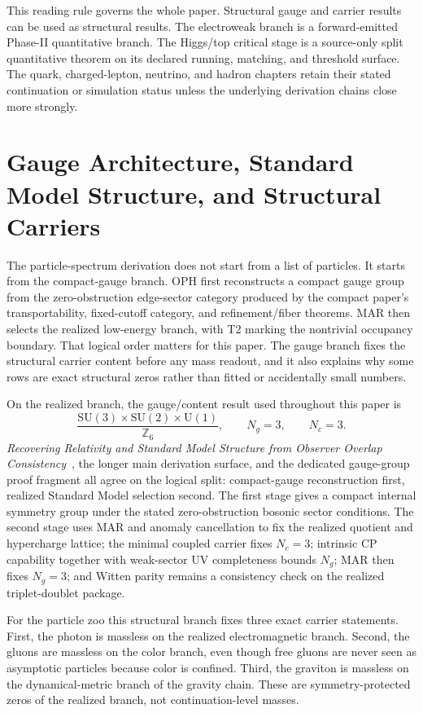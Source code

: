 \documentclass[11pt]{article}
\newcommand{\SU}{\mathrm{SU}}
\newcommand{\U}{\mathrm{U}}
\begin{document}
This reading rule governs the whole paper. Structural gauge and carrier results can be used
as structural results. The electroweak branch is a forward-emitted Phase-II
quantitative branch. The
Higgs/top critical stage is a source-only split quantitative theorem on its declared running, matching, and threshold surface. The quark,
charged-lepton, neutrino, and hadron chapters retain their stated continuation or
simulation status unless the underlying derivation chains close more strongly.

\section{Gauge Architecture, Standard Model Structure, and Structural Carriers}

The particle-spectrum derivation does not start from a list of particles. It starts from the
compact-gauge branch. OPH first reconstructs a compact gauge
group from the zero-obstruction edge-sector category produced by the compact paper's
transportability, fixed-cutoff category, and refinement/fiber theorems. MAR then selects the
realized low-energy branch, with T2 marking the nontrivial occupancy boundary. That logical order matters for this paper. The
gauge branch fixes the structural carrier content before any mass readout, and it also explains
why some rows are exact structural zeros rather than fitted or accidentally small numbers.

On the realized branch, the gauge/content result used throughout this paper is
\[
\frac{\SU(3)\times\SU(2)\times\U(1)}{\mathbb Z_6},
\qquad
N_g=3,
\qquad
N_c=3.
\]
\emph{Recovering Relativity and Standard Model Structure from Observer Overlap Consistency}~\cite{ophcompact}, the longer main derivation surface, and the dedicated gauge-group proof
fragment all agree on the logical split: compact-gauge reconstruction first, realized Standard
Model selection second. The first stage gives a compact internal symmetry group under the stated
zero-obstruction bosonic sector conditions. The second stage uses MAR and anomaly cancellation to fix the realized
quotient and hypercharge lattice; the minimal coupled carrier fixes \(N_c=3\); intrinsic CP
capability together with weak-sector UV completeness bounds \(N_g\); MAR then fixes \(N_g=3\);
and Witten parity remains a consistency check on the realized triplet-doublet package.

For the particle zoo this structural branch fixes three exact carrier statements.
First, the photon is massless on the realized electromagnetic branch. Second, the gluons are
massless on the color branch, even though free gluons are never seen as asymptotic particles
because color is confined. Third, the graviton is massless on the dynamical-metric branch of the
gravity chain. These are symmetry-protected zeros of the realized branch, not continuation-level
masses.
\end{document}

